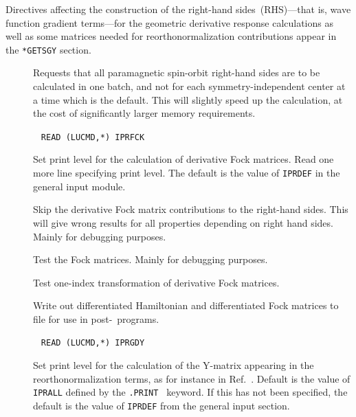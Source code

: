 Directives affecting the construction of the right-hand
sides~(RHS)---that is,
wave function gradient terms---for the geometric derivative response
calculations as well as some matrices needed for reorthonormalization
contributions appear in the \verb|*GETSGY| section.

\begin{description}
\item[] Requests that all paramagnetic
spin-orbit
right-hand sides are to be calculated in one batch, and not for each
symmetry-independent center at a time which is the default. This will
slightly speed up the calculation, at the cost of significantly larger
memory requirements.

\item[]\verb| |\newline
\verb|READ (LUCMD,*) IPRFCK|

Set print level for the calculation of derivative Fock matrices.  Read
one more line specifying print level. The default  is the value of
\verb|IPRDEF| in the general input module.

\item[] Skip the derivative Fock matrix contributions
to the right-hand sides. This will give wrong results for all
properties depending on right hand sides. Mainly for debugging purposes.

\item[] Test the Fock matrices. Mainly for debugging
purposes.

\item[] Test one-index transformation of derivative
Fock matrices.

\item[] Write out differentiated Hamiltonian and
differentiated Fock matrices to file for use in post-\dalton\ programs.

\item[]\verb| |\newline
\verb|READ (LUCMD,*) IPRGDY|

Set print level for the calculation of the Y-matrix appearing in the
reorthonormalization terms, as for instance in
Ref.~\cite{tuhjahjajpjjcp84}. Default  is the value of \verb|IPRALL|
defined by the \verb|.PRINT | keyword. If
this has not been specified, the default is the value of \verb|IPRDEF|
from the general input section.


\end{description}
